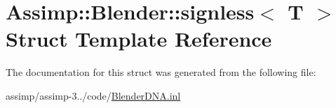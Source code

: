 \hypertarget{struct_assimp_1_1_blender_1_1signless}{\section{Assimp\+:\+:Blender\+:\+:signless$<$ T $>$ Struct Template Reference}
\label{struct_assimp_1_1_blender_1_1signless}
}


The documentation for this struct was generated from the following file\+:\begin{DoxyCompactItemize}
\item 
assimp/assimp-\/3../code/\hyperlink{_blender_d_n_a_8inl}{Blender\+D\+N\+A.\+inl}\end{DoxyCompactItemize}
